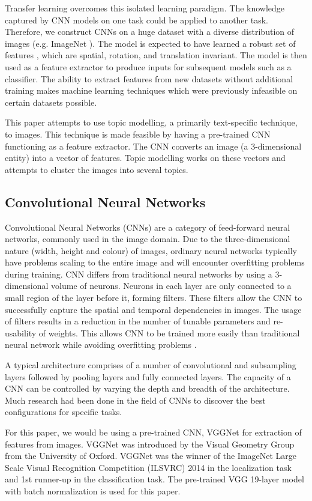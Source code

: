 \documentclass{article}
\begin{document}
Transfer learning overcomes this isolated learning paradigm. The knowledge captured by CNN models on one task could be applied to another task. Therefore, we construct CNNs on a huge dataset with a diverse distribution of images (e.g. ImageNet \cite{imagenet}). The model is expected to have learned a robust set of features \cite{vgg}, which are spatial, rotation, and translation invariant. The model is then used as a feature extractor to produce inputs for subsequent models such as a classifier. The ability to extract features from new datasets without additional training makes machine learning techniques which were previously infeasible on certain datasets possible. 

This paper attempts to use topic modelling, a primarily text-specific technique, to images. This technique is made feasible by having a pre-trained CNN functioning as a feature extractor. The CNN converts an image (a 3-dimensional entity) into a vector of features. Topic modelling works on these vectors and attempts to cluster the images into several topics.

\subsection{Convolutional Neural Networks}
Convolutional Neural Networks (CNNs) are a category of feed-forward neural networks, commonly used in the image domain. Due to the three-dimensional nature (width, height and colour) of images, ordinary neural networks typically have problems scaling to the entire image and will encounter overfitting problems during training. CNN differs from traditional neural networks by using a 3-dimensional volume of neurons. Neurons in each layer are only connected to a small region of the layer before it, forming filters. These filters allow the CNN to successfully capture the spatial and temporal dependencies in images. The usage of filters results in a reduction in the number of tunable parameters and re-usability of weights. This allows CNN to be trained more easily than traditional neural network while avoiding overfitting problems \cite{cnn1}.

A typical architecture comprises of a number of convolutional and subsampling layers followed by pooling layers and fully connected layers. The capacity of a CNN can be controlled by varying the depth and breadth of the architecture. Much research had been done in the field of CNNs to discover the best configurations for specific tasks. 

For this paper, we would be using a pre-trained CNN, VGGNet \cite{vgg} for extraction of features from images. VGGNet was introduced by the Visual Geometry Group from the University of Oxford. VGGNet was the winner of the ImageNet Large Scale Visual Recognition Competition (ILSVRC) 2014 in the localization task and 1st runner-up in the classification task. The pre-trained VGG 19-layer model with batch normalization is used for this paper. 
\end{document}
